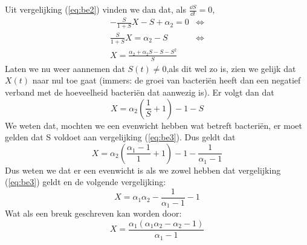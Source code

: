 Uit vergelijking (\ref{eq:be2}) vinden we dan dat, als $\tfrac{\dd S}{\dd t} = 0$,
\begin{align*}
	- \frac{S}{1 + S}X - S + \alpha_2 = 0 		&\iff \\
	\frac{S}{1 + S}X = \alpha_2 - S 			&\iff \\
	X = \frac{\alpha_2 + \alpha_2 S - S - S^2}{S}
\end{align*}
Laten we nu weer aannemen dat $S(t) \not = 0$,als dit wel zo is, zien we gelijk dat $X(t)$ naar nul toe gaat (immers: de groei van bacteri\"en heeft dan een negatief verband met de hoeveelheid bacteri\"en dat aanwezig is). Er volgt dan dat
\begin{equation*}
	X = \alpha_2 \left( \frac{1}{S} + 1 \right) - 1 - S		
\end{equation*}
We weten dat, mochten we een evenwicht hebben wat betreft bacteri\"en, er moet gelden dat S voldoet aan vergelijking (\ref{eq:be3}). Dus geldt dat
\begin{equation*}
	X = \alpha_2 \left( \frac{\alpha_1 - 1}{1} + 1 \right) - 1 - \frac{1}{\alpha_1 - 1}
\end{equation*}
Dus weten we dat er een evenwicht is als we zowel hebben dat vergelijking (\ref{eq:be3}) geldt en de volgende vergelijking:
\begin{equation*}
	X = \alpha_1\alpha_2 - \frac{1}{\alpha_1 - 1} - 1
\end{equation*}
Wat als een breuk geschreven kan worden door:
\begin{equation}
	X = \frac{ \alpha_1(\alpha_1 \alpha_2 - \alpha_2 - 1)}{ \alpha_1 - 1} 		\label{eq:be4}
\end{equation}

